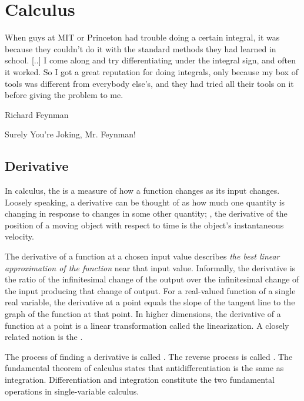 \section{Calculus}

\epigraph{
%
When guys at MIT or Princeton had trouble doing a certain integral, it was because they couldn't do it with the standard methods they had learned in school. [..] I come along and try differentiating under the integral sign, and often it worked. So I got a great reputation for doing integrals, only because my box of tools was different from everybody else's, and they had tried all their tools on it before giving the problem to me.
%
}
{Richard Feynman}
{Surely You're Joking, Mr. Feynman!}


\subsection{Derivative}
In calculus, the  is a measure of how a function changes as its input changes. Loosely speaking, a derivative can be thought of as how much one quantity is changing in response to changes in some other quantity; \eg, the derivative of the position of a moving object with respect to time is the object's instantaneous velocity.

The derivative of a function at a chosen input value describes \emph{the best linear approximation of the function} near that input value. Informally, the derivative is the ratio of the infinitesimal change of the output over the infinitesimal change of the input producing that change of output. For a real-valued function of a single real variable, the derivative at a point equals the slope of the tangent line to the graph of the function at that point. In higher dimensions, the derivative of a function at a point is a linear transformation called the linearization. A closely related notion is the .

The process of finding a derivative is called . The reverse process is called . The fundamental theorem of calculus states that antidifferentiation is the same as integration. Differentiation and integration constitute the two fundamental operations in single-variable calculus.

